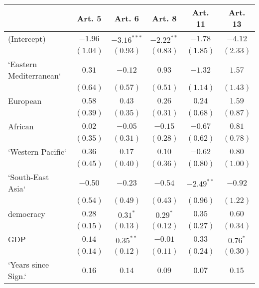 
\begin{table}[!h]
\begin{center}
\begin{tabular}{l c c c c c }
\toprule
 & Art. 5 & Art. 6 & Art. 8 & Art. 11 & Art. 13 \\
\midrule
(Intercept)             & $-1.96$      & $-3.16^{***}$ & $-2.22^{**}$ & $-1.78$      & $-4.12$      \\
                        & $(1.04)$     & $(0.93)$      & $(0.83)$     & $(1.85)$     & $(2.33)$     \\
`Eastern Mediterranean` & $0.31$       & $-0.12$       & $0.93$       & $-1.32$      & $1.57$       \\
                        & $(0.64)$     & $(0.57)$      & $(0.51)$     & $(1.14)$     & $(1.43)$     \\
European                & $0.58$       & $0.43$        & $0.26$       & $0.24$       & $1.59$       \\
                        & $(0.39)$     & $(0.35)$      & $(0.31)$     & $(0.68)$     & $(0.87)$     \\
African                 & $0.02$       & $-0.05$       & $-0.15$      & $-0.67$      & $0.81$       \\
                        & $(0.35)$     & $(0.31)$      & $(0.28)$     & $(0.62)$     & $(0.78)$     \\
`Western Pacific`       & $0.36$       & $0.17$        & $0.10$       & $-0.62$      & $0.80$       \\
                        & $(0.45)$     & $(0.40)$      & $(0.36)$     & $(0.80)$     & $(1.00)$     \\
`South-East Asia`       & $-0.50$      & $-0.23$       & $-0.54$      & $-2.49^{**}$ & $-0.92$      \\
                        & $(0.54)$     & $(0.49)$      & $(0.43)$     & $(0.96)$     & $(1.22)$     \\
democracy               & $0.28$       & $0.31^{*}$    & $0.29^{*}$   & $0.35$       & $0.60$       \\
                        & $(0.15)$     & $(0.13)$      & $(0.12)$     & $(0.27)$     & $(0.34)$     \\
GDP                     & $0.14$       & $0.35^{**}$   & $-0.01$      & $0.33$       & $0.76^{*}$   \\
                        & $(0.14)$     & $(0.12)$      & $(0.11)$     & $(0.24)$     & $(0.30)$     \\
`Years since Sign.`     & $0.16$       & $0.14$        & $0.09$       & $0.07$       & $0.15$       \\

\end{tabular}
\end{center}
\end{table}
